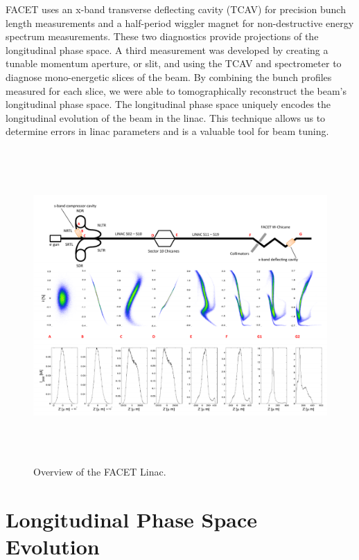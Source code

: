\documentclass[%
twocolumn,
showpacs,preprintnumbers,
 aps,
prstab,
]{revtex4-1}
\begin{document}
FACET uses an x-band transverse deflecting cavity (TCAV) for precision bunch length measurements and a half-period wiggler magnet for non-destructive energy spectrum measurements. These two diagnostics provide projections of the longitudinal phase space. A third measurement was developed by creating a tunable momentum aperture, or slit, and using the TCAV and spectrometer to diagnose mono-energetic slices of the beam. By combining the bunch profiles measured for each slice, we were able to tomographically reconstruct the beam's longitudinal phase space. The longitudinal phase space uniquely encodes the longitudinal evolution of the beam in the linac. This technique allows us to determine errors in linac parameters and is a valuable tool for beam tuning.

\begin{figure}[htb]
\includegraphics[width=\textwidth,height=12cm]{figures/facet_schem.pdf}
  \caption{Overview of the FACET Linac.}
  \label{schem}
\end{figure}



\section{Longitudinal Phase Space Evolution}\label{sec:facet}
\end{document}

